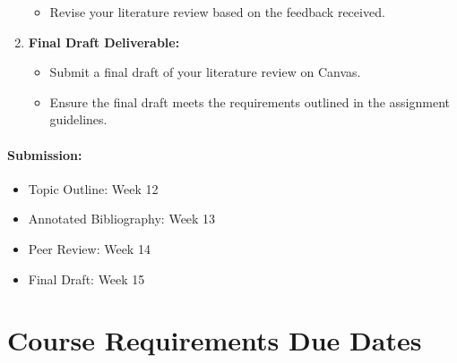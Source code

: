 \documentclass[12pt, letterpaper]{article}
\begin{document}
\begin{enumerate}
\begin{itemize}
        \item Revise your literature review based on the feedback received.
    \end{itemize}
    \item \textbf{Final Draft Deliverable:}
    \begin{itemize}
        \item Submit a final draft of your literature review on Canvas.
        \item Ensure the final draft meets the requirements outlined in the assignment guidelines.
    \end{itemize}
\end{enumerate}

\paragraph*{Submission:}
\begin{itemize}
    \item Topic Outline: Week 12
    \item Annotated Bibliography: Week 13
    \item Peer Review: Week 14
    \item Final Draft: Week 15
\end{itemize}

\section{Course Requirements Due Dates}
\end{document}
